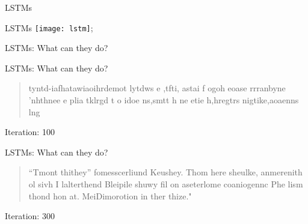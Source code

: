 \begin{slide}{LSTMs}
\end{slide}

\begin{slide}{LSTMs}
  \texttt{[image: lstm]};
\end{slide}

\begin{slide}{LSTMs: What can they do?}
\end{slide}

\begin{slide}{LSTMs: What can they do?}
  \begin{quote}
    tyntd-iafhatawiaoihrdemot  lytdws  e ,tfti, astai f ogoh eoase rrranbyne 'nhthnee e plia tklrgd t o idoe ns,smtt   h ne etie h,hregtrs nigtike,aoaenns lng
  \end{quote}
  \vspace{0.25cm}
  Iteration: 100
\begin{flushleft}\cite{lstm}\end{flushleft}
\end{slide}

\begin{slide}{LSTMs: What can they do?}
  \begin{quote}
    ``Tmont thithey'' fomesscerliund
      Keushey. Thom here
      sheulke, anmerenith ol sivh I lalterthend Bleipile shuwy fil on aseterlome
      coaniogennc Phe lism thond hon at. MeiDimorotion in ther thize."
  \end{quote}
  \vspace{0.25cm}
  Iteration: 300
\begin{flushleft}\cite{lstm}\end{flushleft}
\end{slide}

